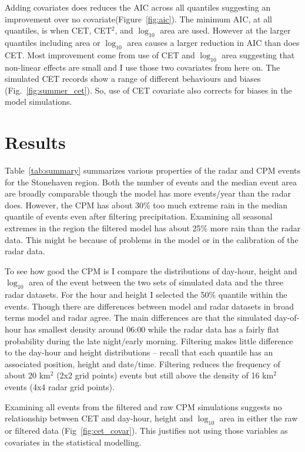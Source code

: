 \documentclass[11pt,a4paper]{article}
\begin{document}
Adding covariates does reduces the AIC across all quantiles suggesting an improvement over no covariate(Figure~\ref{fig:aic}). The minimum AIC, at all quantiles, is when CET, CET$^2$,  and $\log_{10}$ area are used. However at the larger quantiles including area or $\log_{10}$ area causes a larger reduction in AIC than does CET.  Most improvement come from use of CET and $\log_{10}$ area suggesting that non-linear effects are small and I use those two covariates from here on. 
The simulated CET records show a range of different behaviours and biases (Fig.~\ref{fig:summer_cet}). So, use of CET covariate also corrects for biases in the model simulations. 


\section{Results}

Table~\ref{tab:summary} summarizes various properties of the radar and CPM events for the Stonehaven region.  Both the number of events and the median event area are broadly comparable though the model has more events/year than the radar does.  However, the CPM has about 30\% too much extreme rain in the median quantile of events even after filtering precipitation. Examining  all seasonal extremes in the region the filtered model has about 25\% more rain than the radar data.  This might be because of problems in the model or in the calibration of the radar data. 

To see how good the CPM is I compare the distributions of  day-hour, height and  $\log_{10}$ area of the event between the two sets of simulated data and the three radar datasets. For the hour and height I selected the 50\% quantile within the events. Though there are differences between model and radar datasets in broad terms model and radar agree. The main differences are that the simulated day-of-hour has smallest density around 06:00 while the radar data has a fairly flat probability during the late night/early morning. Filtering makes little difference to the day-hour and height distributions -- recall that each quantile has an associated position, height and date/time. Filtering reduces the frequency of about 20 km$^2$ (2x2 grid points) events but still above the density of 16 km$^2$ events (4x4 radar grid points). 

Examining all events from the filtered and raw CPM simulations suggests no relationship between CET and day-hour, height and $\log_{10}$ area in either the raw or filtered data (Fig~\ref{fig:cet_covar}). This justifies not using those variables as covariates in the statistical modelling. 
\end{document}

